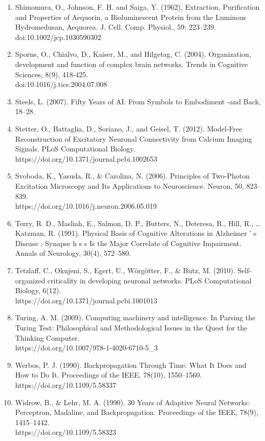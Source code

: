 \documentclass[11pt]{article}
\begin{document}
\begin{enumerate}
\item Shimomura, O., Johnson, F. H. and Saiga, Y. (1962), Extraction, Purification and Properties of Aequorin, a Bioluminescent Protein from the Luminous Hydromedusan, Aequorea. J. Cell. Comp. Physiol., 59: 223–239. doi:10.1002/jcp.1030590302
\item Sporns, O., Chialvo, D., Kaiser, M., and Hilgetag, C. (2004). Organization, development and function of complex brain networks. Trends in Cognitive Sciences, 8(9), 418-425. \\doi:10.1016/j.tics.2004.07.008
\item Steels, L. (2007). Fifty Years of AI: From Symbols to Embodiment -and Back, 18–28.
\item Stetter, O., Battaglia, D., Soriano, J., and Geisel, T. (2012). Model-Free Reconstruction of Excitatory Neuronal Connectivity from Calcium Imaging Signals. PLoS Computational Biology. https://doi.org/10.1371/journal.pcbi.1002653
\item Svoboda, K., Yasuda, R., \& Carolina, N. (2006). Principles of Two-Photon Excitation Microscopy and Its Applications to Neuroscience. Neuron, 50, 823–839.\\https://doi.org/10.1016/j.neuron.2006.05.019
\item Terry, R. D., Masliah, E., Salmon, D. P., Butters, N., Deteresa, R., Hill, R., … Katzman, R. (1991). Physical Basis of Cognitive Alterations in Alzheimer ’ s Disease : Synapse h s s Is the Major Correlate of Cognitive Impairment. Annals of Neurology, 30(4), 572–580.
\item Tetzlaff, C., Okujeni, S., Egert, U., Wörgötter, F., \& Butz, M. (2010). Self-organized criticality in developing neuronal networks. PLoS Computational Biology, 6(12).\\https://doi.org/10.1371/journal.pcbi.1001013
\item Turing, A. M. (2009). Computing machinery and intelligence. In Parsing the Turing Test: Philosophical and Methodological Issues in the Quest for the Thinking Computer.\\https://doi.org/10.1007/978-1-4020-6710-5\_3
\item Werbos, P. J. (1990). Backpropagation Through Time: What It Does and How to Do It. Proceedings of the IEEE, 78(10), 1550–1560. https://doi.org/10.1109/5.58337
\item Widrow, B., \& Lehr, M. A. (1990). 30 Years of Adaptive Neural Networks: Perceptron, Madaline, and Backpropagation. Proceedings of the IEEE, 78(9), 1415–1442.\\https://doi.org/10.1109/5.58323

\end{enumerate}
\end{document}
